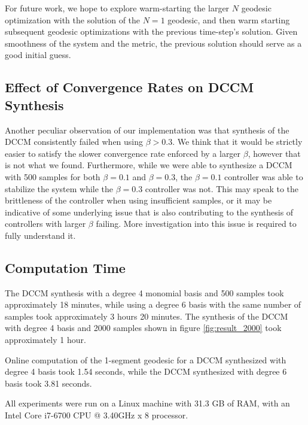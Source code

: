 \documentclass[journal]{IEEEtran}
\begin{document}
For future work, we hope to explore warm-starting the larger $N$ geodesic optimization with the solution of the $N=1$ geodesic, and then warm starting subsequent geodesic optimizations with the previous time-step's solution. Given smoothness of the system and the metric, the previous solution should serve as a good initial guess.

\subsection{Effect of Convergence Rates on DCCM Synthesis}
Another peculiar observation of our implementation was that synthesis of the DCCM consistently failed when using $\beta > 0.3$. We think that it would be strictly easier to satisfy the slower convergence rate enforced by a larger $\beta$, however that is not what we found. Furthermore, while we were able to synthesize a DCCM with 500 samples for both $\beta = 0.1$ and $\beta = 0.3$, the $\beta = 0.1$ controller was able to stabilize the system while the $\beta = 0.3$ controller was not. This may speak to the brittleness of the controller when using insufficient samples, or it may be indicative of some underlying issue that is also contributing to the synthesis of controllers with larger $\beta$ failing. More investigation into this issue is required to fully understand it.

\subsection{Computation Time}
The DCCM synthesis with a degree 4 monomial basis and 500 samples took approximately 18 minutes, while using a degree 6 basis with the same number of samples took approximately 3 hours 20 minutes. The synthesis of the DCCM with degree 4 basis and 2000 samples shown in figure \ref{fig:result_2000} took approximately 1 hour.

Online computation of the 1-segment geodesic for a DCCM synthesized with degree 4 basis took 1.54 seconds, while the DCCM synthesized with degree 6 basis took 3.81 seconds.

All experiments were run on a Linux machine with 31.3 GB of RAM, with an Intel Core i7-6700 CPU @ 3.40GHz x 8 processor.
\end{document}
